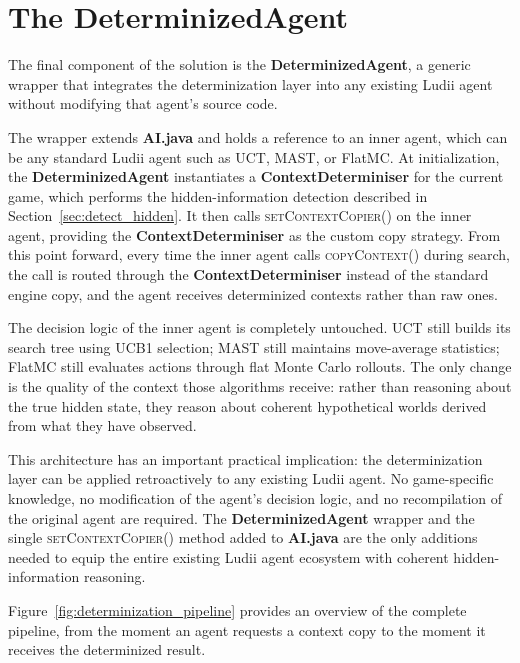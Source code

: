 \section{The DeterminizedAgent}
\label{sec:determinized_agent}

The final component of the solution is the \textbf{DeterminizedAgent}, a generic wrapper that integrates the determinization layer into any existing Ludii agent without modifying that agent's source code.

The wrapper extends \textbf{AI.java} and holds a reference to an inner agent, which can be any standard Ludii agent such as UCT, MAST, or FlatMC. At initialization, the \textbf{DeterminizedAgent} instantiates a \textbf{ContextDeterminiser} for the current game, which performs the hidden-information detection described in Section~\ref{sec:detect_hidden}. It then calls \textsc{setContextCopier()} on the inner agent, providing the \textbf{ContextDeterminiser} as the custom copy strategy. From this point forward, every time the inner agent calls \textsc{copyContext()} during search, the call is routed through the \textbf{ContextDeterminiser} instead of the standard engine copy, and the agent receives determinized contexts rather than raw ones.

The decision logic of the inner agent is completely untouched. UCT still builds its search tree using UCB1 selection; MAST still maintains move-average statistics; FlatMC still evaluates actions through flat Monte Carlo rollouts. The only change is the quality of the context those algorithms receive: rather than reasoning about the true hidden state, they reason about coherent hypothetical worlds derived from what they have observed.

This architecture has an important practical implication: the determinization layer can be applied retroactively to any existing Ludii agent. No game-specific knowledge, no modification of the agent's decision logic, and no recompilation of the original agent are required. The \textbf{DeterminizedAgent} wrapper and the single \textsc{setContextCopier()} method added to \textbf{AI.java} are the only additions needed to equip the entire existing Ludii agent ecosystem with coherent hidden-information reasoning.

Figure~\ref{fig:determinization_pipeline} provides an overview of the complete pipeline, from the moment an agent requests a context copy to the moment it receives the determinized result.

